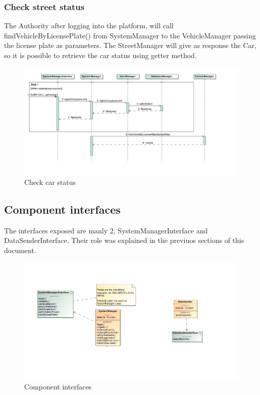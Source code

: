 \subsubsection{Check street status}
The Authority after logging into the platform, will call findVehicleByLicensePlate() from SystemManager to the VehicleManager passing the license plate as parameters. The StreetManager will give as response the Car, so it is possible to retrieve the car status using getter method.
\begin{figure}
	\centering
	\includegraphics[width=0.95\linewidth, height=0.35\textheight]{Images/RunTimeDiagram/Sequence6}
	\caption{Check car status}
	\label{fig:Check car status}
\end{figure}


\subsection{Component interfaces}

The interfaces exposed are manly 2, SystemManagerInterface and DataSenderInterface. Their role was explained in the previuos sections of this document.

\begin{figure}[H]
	\centering
	\includegraphics[width=1.12\linewidth]{Images/ComponentInterfaces.png}
	\caption{Component interfaces}
\end{figure}



